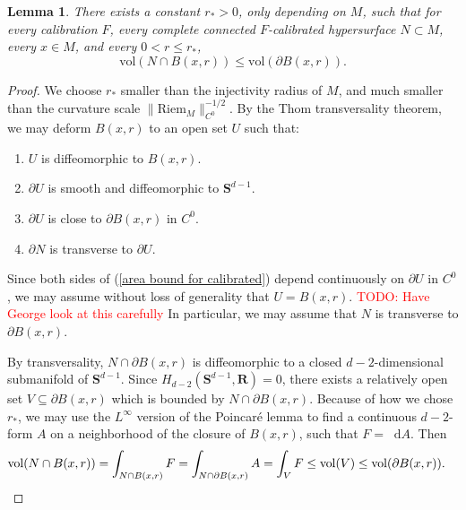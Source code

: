 \documentclass[reqno,11pt]{amsart}
\newcommand{\RR}{\mathbf{R}}
\newcommand{\Sph}{\mathbf S}
\newcommand*\dif{\mathop{}\!\mathrm{d}}
\newcommand{\vol}{\mathrm{vol}}
\newcommand{\Riem}{\mathrm{Riem}}
\newtheorem{lemma}[theorem]{Lemma}
\theoremstyle{definition}
\numberwithin{equation}{section}
\newcommand\todo[1]{\textcolor{red}{TODO: #1}}
\begin{document}
\begin{lemma}
There exists a constant $r_* > 0$, only depending on $M$, such that for every calibration $F$, every complete connected $F$-calibrated hypersurface $N \subset M$, every $x \in M$, and every $0 < r \leq r_*$,
\begin{equation}\label{area bound for calibrated}
\vol(N \cap B(x, r)) \leq \vol(\partial B(x, r)).
\end{equation}
\end{lemma}
\begin{proof}
We choose $r_*$ smaller than the injectivity radius of $M$, and much smaller than the curvature scale $\|\Riem_M\|_{C^0}^{-1/2}$.
By the Thom transversality theorem, we may deform $B(x, r)$ to an open set $U$ such that:
\begin{enumerate}
\item $U$ is diffeomorphic to $B(x, r)$.
\item $\partial U$ is smooth and diffeomorphic to $\Sph^{d - 1}$.
\item $\partial U$ is close to $\partial B(x, r)$ in $C^0$.
\item $\partial N$ is transverse to $\partial U$.
\end{enumerate}
Since both sides of (\ref{area bound for calibrated}) depend continuously on $\partial U$ in $C^0$, we may assume without loss of generality that $U = B(x, r)$.
\todo{Have George look at this carefully}
In particular, we may assume that $N$ is transverse to $\partial B(x, r)$.

By transversality, $N \cap \partial B(x, r)$ is diffeomorphic to a closed $d - 2$-dimensional submanifold of $\Sph^{d - 1}$.
Since $H_{d - 2}(\Sph^{d - 1}, \RR) = 0$, there exists a relatively open set $V \subseteq \partial B(x, r)$ which is bounded by $N \cap \partial B(x, r)$.
Because of how we chose $r_*$, we may use the $L^\infty$ version of the Poincar\'e lemma \cite[Proposition A.1]{BackusBest1} to find a continuous $d - 2$-form $A$ on a neighborhood of the closure of $B(x, r)$, such that $F = \dif A$.
Then
\begin{align*}
\vol(N \cap B(x, r)) &= \int_{N \cap B(x, r)} F = \int_{N \cap \partial B(x, r)} A = \int_V F \leq \vol(V) \leq \vol(\partial B(x, r)). \qedhere
\end{align*}
\end{proof}
\end{document}
